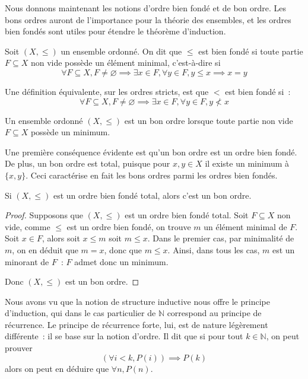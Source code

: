 Nous donnons maintenant les notions d'ordre bien fondé et de bon ordre. Les bons
ordres auront de l'importance pour la théorie des ensembles, et les ordres bien
fondés sont utiles pour étendre le théorème d'induction.

\begin{definition}
  Soit $(X,\leq)$ un ensemble ordonné. On dit que $\leq$ est bien fondé si toute
  partie $F\subseteq X$ non vide possède un élément minimal, c'est-à-dire si
  \[\forall F \subseteq X, F\neq \varnothing \implies \exists x\in F,
  \forall y\in F, y\leq x \implies x = y\]
\end{definition}

\begin{remark}
  Une définition équivalente, sur les ordres stricts, est que $<$ est bien fondé
  si~:
  \[\forall F \subseteq X, F\neq \varnothing \implies \exists x \in F,
  \forall y \in F, y\nless x\]
\end{remark}

\begin{definition}
  Un ensemble ordonné $(X,\leq)$ est un bon ordre lorsque toute partie non vide
  $F\subseteq X$ possède un minimum.
\end{definition}

Une première conséquence évidente est qu'un bon ordre est un ordre bien fondé.
De plus, un bon ordre est total, puisque pour $x,y\in X$ il existe un minimum
à $\{x,y\}$. Ceci caractérise en fait les bons ordres parmi les ordres bien
fondés.

\begin{proposition}
  Si $(X,\leq)$ est un ordre bien fondé total, alors c'est un bon ordre.
\end{proposition}

\begin{proof}
  Supposons que $(X,\leq)$ est un ordre bien fondé total. Soit $F\subseteq X$
  non vide, comme $\leq$ est un ordre bien fondé, on trouve $m$ un élément
  minimal de $F$. Soit $x\in F$, alors soit $x \leq m$ soit $m\leq x$. Dans le
  premier cas, par minimalité de $m$, on en déduit que $m = x$, donc que
  $m\leq x$. Ainsi, dans tous les cas, $m$ est un minorant de $F$~: $F$ admet
  donc un minimum.

  Donc $(X,\leq)$ est un bon ordre.
\end{proof}

Nous avons vu que la notion de structure inductive nous offre le principe
d'induction, qui dans le cas particulier de $\mathbb N$ correspond au principe
de récurrence. Le principe de récurrence forte, lui, est de nature légèrement
différente~: il se base sur la notion d'ordre. Il dit que si pour tout
$k\in\mathbb N$, on peut prouver
\[(\forall i < k, P(i)) \implies P(k)\]
alors on peut en déduire que $\forall n, P(n)$.

